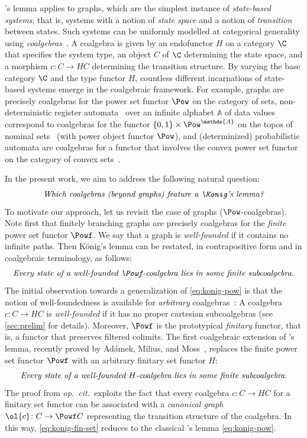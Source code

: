 \documentclass[a4paper,UKenglish, autoref, numberwithinsect, final]{lipics-v2021}
\numberwithin{equation}{section}
\theoremstyle{plain}
\theoremstyle{definition}
\begin{document}
\Konig's lemma applies to graphs, which are the simplest instance of \emph{state-based systems}, that is, systems with a notion of \emph{state space} and a notion of \emph{transition} between states. Such systems can be uniformly modelled at categorical generality using \emph{coalgebras}~\cite{jacobs16,rutten00}. A {coalgebra} is given by an endofunctor $H$ on a category $\C$ that specifies the {system type}, an object $C$ of $\C$ determining the state space, and a morphism $c\colon C\to HC$ determining the transition structure. By varying the base category $\C$ and the type functor $H$, countless different incarnations of state-based systems emerge in the coalgebraic framework. For example, graphs are precisely coalgebras for the power set functor $\Pow$ on the category of sets, non-deterministic register automata~\cite{KaminskiFrancez94} over an infinite alphabet $\mathds{A}$ of data values correspond to coalgebras for the functor $\{0,1\}\times \Pow^{\mathds{A}}$ on the topos of nominal sets~\cite{BojanczykEA14} (with power object functor $\Pow$), and (determinized) probabilistic automata are coalgebras for a functor that involves the convex power set functor on the category of convex sets~\cite{bss17}.

In the present work, we aim to address the following natural question:
\[ \emph{Which coalgebras (beyond graphs) feature a \Konig's lemma?} \]
To motivate our approach, let us revisit the case of graphs ($\Pow$-coalgebras). Note first that finitely branching graphs are precisely coalgebras for the \emph{finite} power set functor $\Powf$. We say that a graph is \emph{well-founded} if it contains no infinite paths. Then König's lemma can be restated, in contrapositive form and in coalgebraic terminology, as follows:
\begin{equation}\label{eq:konig-pow} \emph{Every state of a well-founded $\Powf$-coalgebra lies in some finite subcoalgebra}. \end{equation}
The initial observation towards a generalization of \eqref{eq:konig-pow} is that the notion of well-foundedness is available for \emph{arbitrary} coalgebras~\cite{taylor99,amm25}: A coalgebra $c\colon C\to HC$ is \emph{well-founded} if it has no proper {cartesian} subcoalgebras (see \autoref{sec:prelim} for details). Moreover, $\Powf$ is the prototypical \emph{finitary} functor, that is, a functor that preserves filtered colimits. The first coalgebraic extension of \Konig's lemma, recently proved by Ad\'amek, Milius, and Moss~\cite[Prop.~9.2.19]{amm25}, replaces the finite power set functor $\Powf$ with an arbitrary finitary set functor $H$:
\begin{equation}\label{eq:konig-fin-set} \emph{Every state of a well-founded $H$-coalgebra lies in some finite subcoalgebra}. \end{equation}
The proof from \emph{op.~cit.}\ exploits the fact that every coalgebra $c\colon C\to HC$ for a finitary set functor can be associated with a \emph{canonical graph} $\ol{c}\colon C\to \Powf C$ representing the transition structure of the coalgebra. In this way, \eqref{eq:konig-fin-set} reduces to the classical \Konig's lemma \eqref{eq:konig-pow}. 
\end{document}
